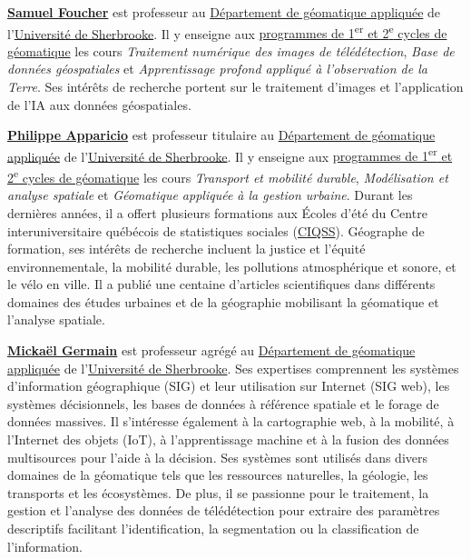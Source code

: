 \documentclass[
  11pt,
  letterpaper,
  open=any,
  twoside=false,
  french]{scrbook}
\begin{document}

\href{https://www.usherbrooke.ca/recherche/fr/specialistes/details/samuel.foucher}{\textbf{Samuel
Foucher}} est professeur au
\href{https://www.usherbrooke.ca/geomatique/}{Département de géomatique
appliquée} de l'\href{https://www.usherbrooke.ca/}{Université de
Sherbrooke}. Il y enseigne aux
\href{https://www.usherbrooke.ca/geomatique/etudes/programmes}{programmes
de 1\textsuperscript{er} et 2\textsuperscript{e} cycles de géomatique}
les cours \emph{Traitement numérique des images de télédétection},
\emph{Base de données géospatiales} et \emph{Apprentissage profond
appliqué à l'observation de la Terre}. Ses intérêts de recherche portent
sur le traitement d'images et l'application de l'IA aux données
géospatiales.

\href{https://www.usherbrooke.ca/recherche/fr/specialistes/details/philippe.apparicio}{\textbf{Philippe
Apparicio}} est professeur titulaire au
\href{https://www.usherbrooke.ca/geomatique/}{Département de géomatique
appliquée} de l'\href{https://www.usherbrooke.ca/}{Université de
Sherbrooke}. Il y enseigne aux
\href{https://www.usherbrooke.ca/geomatique/etudes/programmes}{programmes
de 1\textsuperscript{er} et 2\textsuperscript{e} cycles de géomatique}
les cours \emph{Transport et mobilité durable}, \emph{Modélisation et
analyse spatiale} et \emph{Géomatique appliquée à la gestion urbaine}.
Durant les dernières années, il a offert plusieurs formations aux Écoles
d'été du Centre interuniversitaire québécois de statistiques sociales
(\href{https://www.ciqss.org/}{CIQSS}). Géographe de formation, ses
intérêts de recherche incluent la justice et l'équité environnementale,
la mobilité durable, les pollutions atmosphérique et sonore, et le vélo
en ville. Il a publié une centaine d'articles scientifiques dans
différents domaines des études urbaines et de la géographie mobilisant
la géomatique et l'analyse spatiale.

\href{https://www.usherbrooke.ca/geomatique/departement/personnel/personnel-enseignant/mickael-germain}{\textbf{Mickaël
Germain}} est professeur agrégé au
\href{https://www.usherbrooke.ca/geomatique/}{Département de géomatique
appliquée} de l'\href{https://www.usherbrooke.ca/}{Université de
Sherbrooke}. Ses expertises comprennent les systèmes d'information
géographique (SIG) et leur utilisation sur Internet (SIG web), les
systèmes décisionnels, les bases de données à référence spatiale et le
forage de données massives. Il s'intéresse également à la cartographie
web, à la mobilité, à l'Internet des objets (IoT), à l'apprentissage
machine et à la fusion des données multisources pour l'aide à la
décision. Ses systèmes sont utilisés dans divers domaines de la
géomatique tels que les ressources naturelles, la géologie, les
transports et les écosystèmes. De plus, il se passionne pour le
traitement, la gestion et l'analyse des données de télédétection pour
extraire des paramètres descriptifs facilitant l'identification, la
segmentation ou la classification de l'information.
\end{document}
